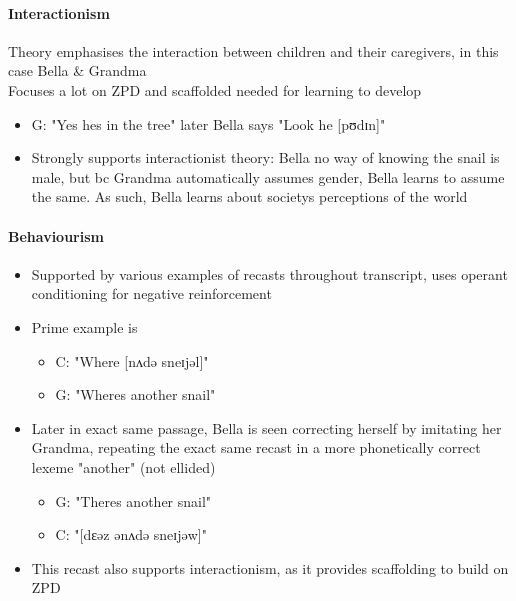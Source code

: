 \documentclass[
]{article}
\providecommand{\tightlist}{%
  \setlength{\itemsep}{0pt}\setlength{\parskip}{0pt}}
\begin{document}
\hypertarget{interactionism}{%
\paragraph{Interactionism}\label{interactionism}}

Theory emphasises the interaction between children and their caregivers,
in this case Bella \& Grandma\\
Focuses a lot on ZPD and scaffolded needed for learning to develop

\begin{itemize}
\tightlist
\item
  G: "Yes he\textquotesingle s in the tree" later Bella says "Look he
  {[}pʊdɪn{]}"
\item
  Strongly supports interactionist theory: Bella no way of knowing the
  snail is male, but bc Grandma automatically assumes gender, Bella
  learns to assume the same. As such, Bella learns about
  society\textquotesingle s perceptions of the world
\end{itemize}

\hypertarget{behaviourism}{%
\paragraph{Behaviourism}\label{behaviourism}}

\begin{itemize}
\tightlist
\item
  Supported by various examples of recasts throughout transcript, uses
  operant conditioning for negative reinforcement
\item
  Prime example is

  \begin{itemize}
  \tightlist
  \item
    C: "Where {[}nʌdə sneɪjəl{]}"
  \item
    G: "Where\textquotesingle s another snail"
  \end{itemize}
\item
  Later in exact same passage, Bella is seen correcting herself by
  imitating her Grandma, repeating the exact same recast in a more
  phonetically correct lexeme "another" (not ellided)

  \begin{itemize}
  \tightlist
  \item
    G: "There\textquotesingle s another snail"
  \item
    C: "{[}dɛəz ənʌdə sneɪjəw{]}"
  \end{itemize}
\item
  This recast also supports interactionism, as it provides scaffolding
  to build on ZPD
\end{itemize}
\end{document}
